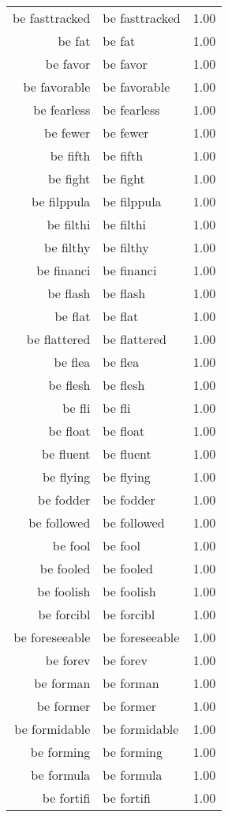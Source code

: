 \begin{table}[ht]
\begin{tabular}{rlr}
  be fasttracked & be fasttracked & 1.00 \\ 
  be fat & be fat & 1.00 \\ 
  be favor & be favor & 1.00 \\ 
  be favorable & be favorable & 1.00 \\ 
  be fearless & be fearless & 1.00 \\ 
  be fewer & be fewer & 1.00 \\ 
  be fifth & be fifth & 1.00 \\ 
  be fight & be fight & 1.00 \\ 
  be filppula & be filppula & 1.00 \\ 
  be filthi & be filthi & 1.00 \\ 
  be filthy & be filthy & 1.00 \\ 
  be financi & be financi & 1.00 \\ 
  be flash & be flash & 1.00 \\ 
  be flat & be flat & 1.00 \\ 
  be flattered & be flattered & 1.00 \\ 
  be flea & be flea & 1.00 \\ 
  be flesh & be flesh & 1.00 \\ 
  be fli & be fli & 1.00 \\ 
  be float & be float & 1.00 \\ 
  be fluent & be fluent & 1.00 \\ 
  be flying & be flying & 1.00 \\ 
  be fodder & be fodder & 1.00 \\ 
  be followed & be followed & 1.00 \\ 
  be fool & be fool & 1.00 \\ 
  be fooled & be fooled & 1.00 \\ 
  be foolish & be foolish & 1.00 \\ 
  be forcibl & be forcibl & 1.00 \\ 
  be foreseeable & be foreseeable & 1.00 \\ 
  be forev & be forev & 1.00 \\ 
  be forman & be forman & 1.00 \\ 
  be former & be former & 1.00 \\ 
  be formidable & be formidable & 1.00 \\ 
  be forming & be forming & 1.00 \\ 
  be formula & be formula & 1.00 \\ 
  be fortifi & be fortifi & 1.00 \\ 

\end{tabular}
\end{table}

